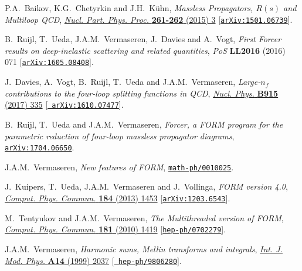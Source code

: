 \documentclass[12pt]{article}
\begin{document}
{\begin{thebibliography}{100}
P.A.~Baikov, K.G.~Chetyrkin and J.H.~K{\"u}hn, \emph{{Massless Propagators,
  $R(s)$ and Multiloop QCD}},
  \href{https://dx.doi.org/10.1016/j.nuclphysbps.2015.03.002}{\emph{Nucl. Part.
  Phys. Proc.} {\bf 261-262} (2015) 3}
  [\href{https://arxiv.org/abs/1501.06739}{{\tt arXiv:1501.06739}}].

B.~Ruijl, T.~Ueda, J.A.M.~Vermaseren, J.~Davies and A.~Vogt, \emph{{First
  Forcer results on deep-inelastic scattering and related quantities}},
  {\emph{PoS} {\bf LL2016} (2016) 071}
  [\href{https://arxiv.org/abs/1605.08408}{{\tt arXiv:1605.08408}}].

J.~Davies, A.~Vogt, B.~Ruijl, T.~Ueda and J.A.M.~Vermaseren, \emph{{Large-$n_f$
  contributions to the four-loop splitting functions in QCD}},
  \href{https://dx.doi.org/10.1016/j.nuclphysb.2016.12.012}{\emph{Nucl. Phys.}
  {\bf B915} (2017) 335} [\href{https://arxiv.org/abs/1610.07477}{{\tt
  arXiv:1610.07477}}].

B.~Ruijl, T.~Ueda and J.A.M.~Vermaseren, \emph{{Forcer, a FORM program for the
  parametric reduction of four-loop massless propagator diagrams}},
  \href{https://arxiv.org/abs/1704.06650}{{\tt arXiv:1704.06650}}.

J.A.M.~Vermaseren, \emph{{New features of FORM}},
  \href{https://arxiv.org/abs/math-ph/0010025}{{\tt math-ph/0010025}}.

J.~Kuipers, T.~Ueda, J.A.M.~Vermaseren and J.~Vollinga, \emph{{FORM version
  4.0}}, \href{https://dx.doi.org/10.1016/j.cpc.2012.12.028}{\emph{Comput.
  Phys. Commun.} {\bf 184} (2013) 1453}
  [\href{https://arxiv.org/abs/1203.6543}{{\tt arXiv:1203.6543}}].

M.~Tentyukov and J.A.M.~Vermaseren, \emph{{The Multithreaded version of FORM}},
  \href{https://dx.doi.org/10.1016/j.cpc.2010.04.009}{\emph{Comput. Phys.
  Commun.} {\bf 181} (2010) 1419}
  [\href{https://arxiv.org/abs/hep-ph/0702279}{{\tt hep-ph/0702279}}].

J.A.M.~Vermaseren, \emph{{Harmonic sums, Mellin transforms and integrals}},
  \href{https://dx.doi.org/10.1142/S0217751X99001032}{\emph{Int. J. Mod. Phys.}
  {\bf A14} (1999) 2037} [\href{https://arxiv.org/abs/hep-ph/9806280}{{\tt
  hep-ph/9806280}}].


\end{thebibliography}}
\end{document}
